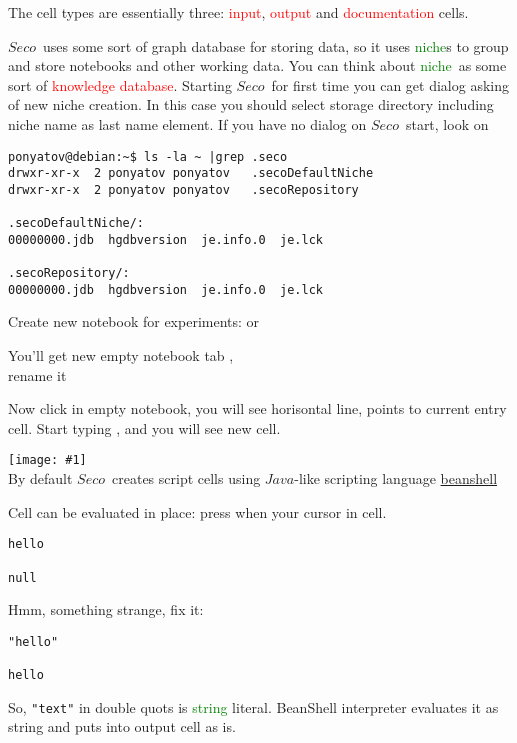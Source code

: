 \documentclass[oneside,10pt]{book}
\newcommand{\fig}[2]{\noindent\texttt{[image: \#1]}}
\renewcommand{\emph}[1]{\textcolor{red}{#1}}
\newcommand{\term}[1]{\textcolor{green}{#1}}
\newcommand{\rms}{$\rhd$}
\newcommand{\seco}{$Seco$}
\newcommand{\java}{$Java$}
\begin{document}
  The cell types are essentially three: \emph{input}, \emph{output} and
  \emph{documentation} cells.
  
  \seco\ uses some sort of graph database for storing data, so it uses
  \term{niche}s to group and store notebooks and other working data.
  You can think about \term{niche}\ as some sort of \emph{knowledge database}.
  Starting \seco\ for first time you can get dialog asking of new niche
  creation. In this case you should select storage directory including niche
  name as last name element. If you have no dialog on \seco\ start, look on
\begin{verbatim}
ponyatov@debian:~$ ls -la ~ |grep .seco
drwxr-xr-x  2 ponyatov ponyatov   .secoDefaultNiche
drwxr-xr-x  2 ponyatov ponyatov   .secoRepository

.secoDefaultNiche/:
00000000.jdb  hgdbversion  je.info.0  je.lck

.secoRepository/:
00000000.jdb  hgdbversion  je.info.0  je.lck
\end{verbatim}

\noindent  
Create new notebook for experiments:  or 

\noindent  
You'll get new empty notebook tab ,\\
rename it \menu{CG>\rms>Rename>Tutorial}
\bigskip

Now click in empty notebook, you will see horisontal line, points to current
entry cell. Start typing , and you will see new cell.

\bigskip
\fig{fig/hello.png}{width=0.8\textwidth}\\
By default \seco\ creates script cells using \java-like scripting language
\href{http://www.beanshell.org/manual/quickstart.html}{beanshell}

\clearpage
Cell can be evaluated in place: press  when your cursor 
in cell.
\begin{verbatim}
hello

null
\end{verbatim}

Hmm, something strange, fix it:

\begin{verbatim}
"hello"

hello
\end{verbatim}

So, \verb$"text"$ in double quots is \term{string} literal. BeanShell
interpreter evaluates it as string and puts into output cell as is.
\end{document}
